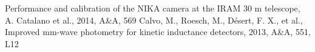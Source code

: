 \documentclass[a4paper,10pt]{article}
\begin{document}
\begin{thebibliography}{}
    Performance and calibration of the NIKA camera at
     the IRAM 30 m telescope, A. Catalano et al., 2014, A\&A, 569
    Calvo, M., Roesch, M., D\'esert, F. X., et al., Improved mm-wave photometry for kinetic inductance detectors, 2013, A\&A, 551, L12
\end{thebibliography}
\end{document}

